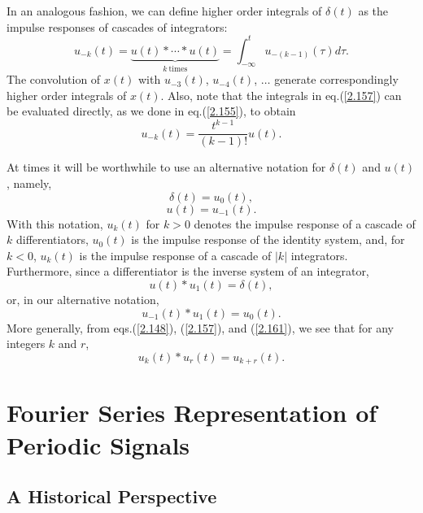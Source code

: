 \documentclass[a4paper,10pt,twoside]{book}
\begin{document}
In an analogous fashion, we can define higher order integrals of $\delta(t)$ as the impulse responses of cascades of integrators:
\begin{equation}
    u_{-k}(t)=\underbrace{u(t)*\cdots*u(t)}_{k\mathrm{~times}}=\int_{-\infty}^{t}u_{-(k-1)}(\tau) d\tau.
    \label{2.157}
\end{equation}
The convolution of $x(t)$ with $u_{-3}(t)$, $u_{-4}(t)$, $\ldots$ generate correspondingly higher order integrals of $x(t)$. Also, note that the integrals in eq.\;(\ref{2.157}) can be evaluated directly, as we done in eq.\;(\ref{2.155}), to obtain
\begin{equation}
    u_{-k}(t)=\frac{t^{k-1}}{(k-1)!}u(t).
    \label{2.158}
\end{equation}

At times it will be worthwhile to use an alternative notation for $\delta(t)$ and $u(t)$, namely,
\begin{equation}
    \delta(t)=u_0(t),
    \label{2.159}
\end{equation}
\begin{equation}
    u(t)=u_{-1}(t).
    \label{2.160}
\end{equation}
With this notation, $u_k(t)$ for $k>0$ denotes the impulse response of a cascade of $k$ differentiators, $u_0(t)$ is the impulse response of the identity system, and, for $k<0$, $u_k(t)$ is the impulse response of a cascade of $|k|$ integrators. Furthermore, since a differentiator is the inverse system of an integrator, $$u(t)*u_1(t)=\delta(t),$$ or, in our alternative notation,
\begin{equation}
    u_{-1}(t)*u_1(t)=u_0(t).
    \label{2.161}
\end{equation}
More generally, from eqs.\;(\ref{2.148}), (\ref{2.157}), and (\ref{2.161}), we see that for any integers $k$ and $r$,
\begin{equation}
    u_k(t)*u_r(t)=u_{k+r}(t).
    \label{2.162}
\end{equation}

\chapter{Fourier Series Representation of Periodic Signals}
\section{A Historical Perspective}
\end{document}
